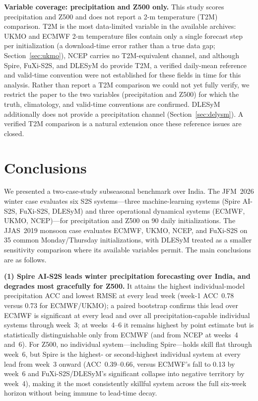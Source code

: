 \documentclass[11pt,a4paper]{article}
\begin{document}
\textbf{Variable coverage: precipitation and Z500 only.} This study scores
precipitation and Z500 and does not report a 2-m temperature (T2M) comparison.
T2M is the most data-limited variable in the available archives: UKMO and ECMWF
2-m temperature files contain only a single forecast step per initialization
(a download-time error rather than a true data gap; Section~\ref{sec:ukmo}),
NCEP carries no T2M-equivalent channel, and although Spire, FuXi-S2S, and DLESyM
do provide T2M, a verified daily-mean reference and valid-time convention were
not established for these fields in time for this analysis. Rather than report a
T2M comparison we could not yet fully verify, we restrict the paper to the two
variables (precipitation and Z500) for which the truth, climatology, and
valid-time conventions are confirmed. DLESyM additionally does not provide a
precipitation channel (Section~\ref{sec:delysm}). A verified T2M comparison is a
natural extension once these reference issues are closed.

\section{Conclusions}\label{sec:conclusions}

We presented a two-case-study subseasonal benchmark over India. The JFM~2026
winter case evaluates six S2S systems---three machine-learning systems (Spire
AI-S2S, FuXi-S2S, DLESyM) and three operational dynamical systems (ECMWF,
UKMO, NCEP)---for precipitation and Z500 on 90 daily initializations. The
JJAS~2019 monsoon case evaluates ECMWF, UKMO, NCEP, and FuXi-S2S on 35 common
Monday/Thursday initializations, with DLESyM treated as a smaller sensitivity
comparison where its available variables permit. The main conclusions
are as follows.

\textbf{(1) Spire AI-S2S leads winter precipitation forecasting over India, and
degrades most gracefully for Z500.} It attains the highest individual-model precipitation ACC
and lowest RMSE at every lead week (week-1 ACC~0.78 versus 0.73 for ECMWF/UKMO);
a paired bootstrap confirms this lead over ECMWF is significant at every lead
and over all precipitation-capable individual systems through week~3; at weeks~4--6 it remains highest by point
estimate but is statistically distinguishable only from ECMWF (and from NCEP
at weeks~4 and~6). For Z500, no individual system---including Spire---holds skill flat
through week~6, but Spire is the highest- or second-highest individual system at
every lead from week~3 onward (ACC~0.39--0.66, versus ECMWF's fall to 0.13 by
week~6 and FuXi-S2S/DLESyM's significant collapse into negative territory by
week~4), making it the most consistently skillful system across the full
six-week horizon without being immune to lead-time decay.
\end{document}
